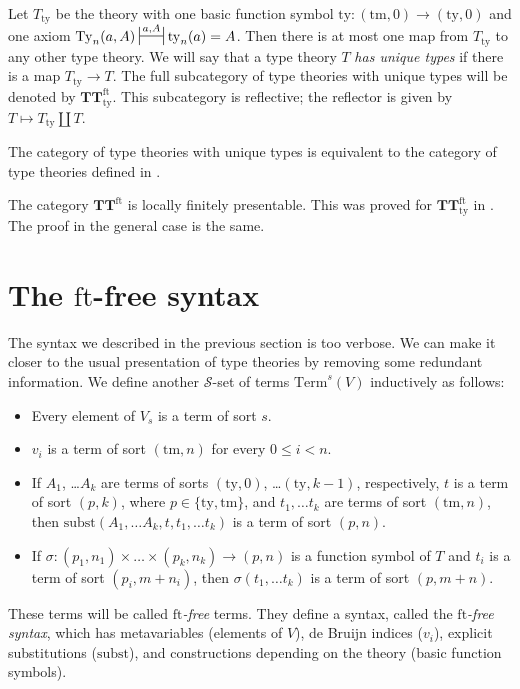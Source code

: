 \documentclass[reqno]{amsart}
\theoremstyle{definition}
\theoremstyle{remark}
\newcommand{\fs}[1]{\mathrm{#1}}
\newcommand{\Term}{\fs{Term}}
\newcommand{\subst}{\fs{subst}}
\newcommand{\ft}{\fs{ft}}
\newcommand{\ty}{\fs{ty}}
\newcommand{\Ty}{\fs{Ty}}
\newcommand{\tm}{\fs{tm}}
\newcommand{\cat}[1]{\mathbf{#1}}
\newcommand{\algtt}{\cat{TT}}
\numberwithin{figure}{section}
\begin{document}
Let $T_\ty$ be the theory with one basic function symbol $\ty : (\tm,0) \to (\ty,0)$ and one axiom $\Ty_n(a,A) \ssststile{}{a,A} \ty_n(a) = A$.
Then there is at most one map from $T_\ty$ to any other type theory.
We will say that a type theory $T$ \emph{has unique types} if there is a map $T_\ty \to T$.
The full subcategory of type theories with unique types will be denoted by $\algtt^\ft_\ty$.
This subcategory is reflective; the reflector is given by $T \mapsto T_\ty \amalg T$.

\begin{remark}
The category of type theories with unique types is equivalent to the category of type theories defined in \cite[Definition~4.5]{alg-tt}.
\end{remark}

\begin{remark}
The category $\algtt^\ft$ is locally finitely presentable.
This was proved for $\algtt^\ft_\ty$ in \cite[Corollary~3.2]{morita-equiv}.
The proof in the general case is the same.
\end{remark}

\section{The $\ft$-free syntax}
\label{sec:contexts}

The syntax we described in the previous section is too verbose.
We can make it closer to the usual presentation of type theories by removing some redundant information.
We define another $\mathcal{S}$-set of terms $\Term^s(V)$ inductively as follows:
\begin{itemize}
\item Every element of $V_s$ is a term of sort $s$.
\item $v_i$ is a term of sort $(\tm,n)$ for every $0 \leq i < n$.
\item If $A_1$, \ldots $A_k$ are terms of sorts $(\ty,0)$, \ldots $(\ty,k-1)$, respectively, $t$ is a term of sort $(p,k)$, where $p \in \{ \ty, \tm \}$, and $t_1, \ldots t_k$ are terms of sort $(\tm,n)$, then $\subst(A_1, \ldots A_k, t, t_1, \ldots t_k)$ is a term of sort $(p,n)$.
\item If $\sigma : (p_1,n_1) \times \ldots \times (p_k,n_k) \to (p,n)$ is a function symbol of $T$ and $t_i$ is a term of sort $(p_i,m+n_i)$, then $\sigma(t_1, \ldots t_k)$ is a term of sort $(p,m+n)$.
\end{itemize}
These terms will be called \emph{$\ft$-free} terms.
They define a syntax, called the \emph{$\ft$-free syntax}, which has metavariables (elements of $V$), de Bruijn indices ($v_i$), explicit substitutions ($\subst$), and constructions depending on the theory (basic function symbols).
\end{document}
